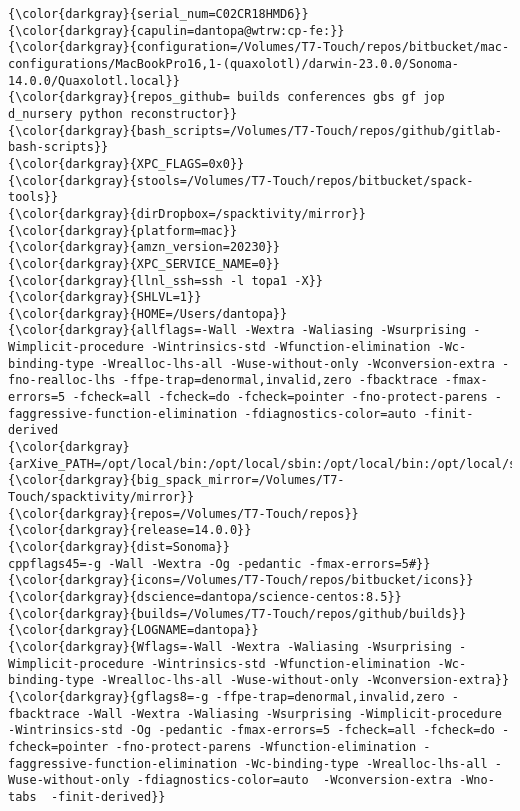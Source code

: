 {{\begin{Verbatim}[commandchars=\\\{\}]
{\color{darkgray}{serial_num=C02CR18HMD6}}
{\color{darkgray}{capulin=dantopa@wtrw:cp-fe:}}
{\color{darkgray}{configuration=/Volumes/T7-Touch/repos/bitbucket/mac-configurations/MacBookPro16,1-(quaxolotl)/darwin-23.0.0/Sonoma-14.0.0/Quaxolotl.local}}
{\color{darkgray}{repos_github= builds conferences gbs gf jop d_nursery python reconstructor}}
{\color{darkgray}{bash_scripts=/Volumes/T7-Touch/repos/github/gitlab-bash-scripts}}
{\color{darkgray}{XPC_FLAGS=0x0}}
{\color{darkgray}{stools=/Volumes/T7-Touch/repos/bitbucket/spack-tools}}
{\color{darkgray}{dirDropbox=/spacktivity/mirror}}
{\color{darkgray}{platform=mac}}
{\color{darkgray}{amzn_version=20230}}
{\color{darkgray}{XPC_SERVICE_NAME=0}}
{\color{darkgray}{llnl_ssh=ssh -l topa1 -X}}
{\color{darkgray}{SHLVL=1}}
{\color{darkgray}{HOME=/Users/dantopa}}
{\color{darkgray}{allflags=-Wall -Wextra -Waliasing -Wsurprising -Wimplicit-procedure -Wintrinsics-std -Wfunction-elimination -Wc-binding-type -Wrealloc-lhs-all -Wuse-without-only -Wconversion-extra -fno-realloc-lhs -ffpe-trap=denormal,invalid,zero -fbacktrace -fmax-errors=5 -fcheck=all -fcheck=do -fcheck=pointer -fno-protect-parens -faggressive-function-elimination -fdiagnostics-color=auto -finit-derived
{\color{darkgray}{arXive_PATH=/opt/local/bin:/opt/local/sbin:/opt/local/bin:/opt/local/sbin:/usr/local/bin:/System/Cryptexes/App/usr/bin:/usr/bin:/bin:/usr/sbin:/sbin:/var/run/com.apple.security.cryptexd/codex.system/bootstrap/usr/local/bin:/var/run/com.apple.security.cryptexd/codex.system/bootstrap/usr/bin:/var/run/com.apple.security.cryptexd/codex.system/bootstrap/usr/appleinternal/bin:/opt/X11/bin:/Library/Apple/usr/bin:/Library/TeX/texbin:/opt/podman/bin:/Users/dantopa/.cabal/bin:/Users/dantopa/.ghcup/bin}}
{\color{darkgray}{big_spack_mirror=/Volumes/T7-Touch/spacktivity/mirror}}
{\color{darkgray}{repos=/Volumes/T7-Touch/repos}}
{\color{darkgray}{release=14.0.0}}
{\color{darkgray}{dist=Sonoma}}
cppflags45=-g -Wall -Wextra -Og -pedantic -fmax-errors=5#}}
{\color{darkgray}{icons=/Volumes/T7-Touch/repos/bitbucket/icons}}
{\color{darkgray}{dscience=dantopa/science-centos:8.5}}
{\color{darkgray}{builds=/Volumes/T7-Touch/repos/github/builds}}
{\color{darkgray}{LOGNAME=dantopa}}
{\color{darkgray}{Wflags=-Wall -Wextra -Waliasing -Wsurprising -Wimplicit-procedure -Wintrinsics-std -Wfunction-elimination -Wc-binding-type -Wrealloc-lhs-all -Wuse-without-only -Wconversion-extra}}
{\color{darkgray}{gflags8=-g -ffpe-trap=denormal,invalid,zero -fbacktrace -Wall -Wextra -Waliasing -Wsurprising -Wimplicit-procedure -Wintrinsics-std -Og -pedantic -fmax-errors=5 -fcheck=all -fcheck=do -fcheck=pointer -fno-protect-parens -Wfunction-elimination -faggressive-function-elimination -Wc-binding-type -Wrealloc-lhs-all -Wuse-without-only -fdiagnostics-color=auto  -Wconversion-extra -Wno-tabs  -finit-derived}}

\end{Verbatim}}}
